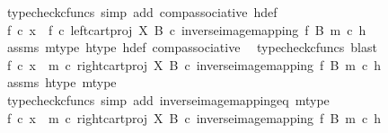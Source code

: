 \begin{isabellebody}
\ {\isacharparenleft}{\kern0pt}typecheck{\isacharunderscore}{\kern0pt}cfuncs{\isacharcomma}{\kern0pt}\ simp\ add{\isacharcolon}{\kern0pt}\ comp{\isacharunderscore}{\kern0pt}associative{}\ h{\isacharunderscore}{\kern0pt}def{\isacharparenright}{\kern0pt}\isanewline
\ \ \isamarkupfalse%
\ \isamarkupfalse%
\ {\isachardoublequoteopen}f\ {\isasymcirc}\isactrlsub c\ x\ {\isacharequal}{\kern0pt}\ {\isacharparenleft}{\kern0pt}f\ {\isasymcirc}\isactrlsub c\ left{\isacharunderscore}{\kern0pt}cart{\isacharunderscore}{\kern0pt}proj\ X\ B\ {\isasymcirc}\isactrlsub c\ inverse{\isacharunderscore}{\kern0pt}image{\isacharunderscore}{\kern0pt}mapping\ f\ B\ m{\isacharparenright}{\kern0pt}\ {\isasymcirc}\isactrlsub c\ h{\isachardoublequoteclose}\isanewline
\ \ \ \ \isamarkupfalse%
\ assms\ m{\isacharunderscore}{\kern0pt}type\ h{\isacharunderscore}{\kern0pt}type\ h{\isacharunderscore}{\kern0pt}def\ comp{\isacharunderscore}{\kern0pt}associative{}\ \isamarkupfalse%
\ {\isacharparenleft}{\kern0pt}typecheck{\isacharunderscore}{\kern0pt}cfuncs{\isacharcomma}{\kern0pt}\ blast{\isacharparenright}{\kern0pt}\isanewline
\ \ \isamarkupfalse%
\ \isamarkupfalse%
\ {\isachardoublequoteopen}f\ {\isasymcirc}\isactrlsub c\ x\ {\isacharequal}{\kern0pt}\ {\isacharparenleft}{\kern0pt}m\ {\isasymcirc}\isactrlsub c\ right{\isacharunderscore}{\kern0pt}cart{\isacharunderscore}{\kern0pt}proj\ X\ B\ {\isasymcirc}\isactrlsub c\ inverse{\isacharunderscore}{\kern0pt}image{\isacharunderscore}{\kern0pt}mapping\ f\ B\ m{\isacharparenright}{\kern0pt}\ {\isasymcirc}\isactrlsub c\ h{\isachardoublequoteclose}\isanewline
\ \ \ \ \isamarkupfalse%
\ assms\ h{\isacharunderscore}{\kern0pt}type\ m{\isacharunderscore}{\kern0pt}type\ \isamarkupfalse%
\ {\isacharparenleft}{\kern0pt}typecheck{\isacharunderscore}{\kern0pt}cfuncs{\isacharcomma}{\kern0pt}\ simp\ add{\isacharcolon}{\kern0pt}\ inverse{\isacharunderscore}{\kern0pt}image{\isacharunderscore}{\kern0pt}mapping{\isacharunderscore}{\kern0pt}eq\ m{\isacharunderscore}{\kern0pt}type{\isacharparenright}{\kern0pt}\isanewline
\ \ \isamarkupfalse%
\ \isamarkupfalse%
\ {\isachardoublequoteopen}f\ {\isasymcirc}\isactrlsub c\ x\ {\isacharequal}{\kern0pt}\ m\ {\isasymcirc}\isactrlsub c\ right{\isacharunderscore}{\kern0pt}cart{\isacharunderscore}{\kern0pt}proj\ X\ B\ {\isasymcirc}\isactrlsub c\ inverse{\isacharunderscore}{\kern0pt}image{\isacharunderscore}{\kern0pt}mapping\ f\ B\ m\ {\isasymcirc}\isactrlsub c\ h{\isachardoublequoteclose}\isanewline

\end{isabellebody}
